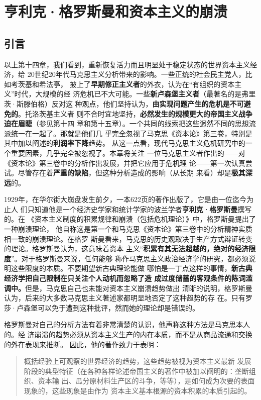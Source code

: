 \chapter{亨利克·格罗斯曼和资本主义的崩溃}

\section{引言}

以上第十四章，我们看到，重新恢复活力而且明显处于稳定状态的世界资本主义经济，给
20世纪20年代马克思主义分析带来的影响。一些正统的社会民主党人，比如考茨基和希法亭，
披上了\textbf{早期修正主义者}的外衣，认为在“有组织的资本主义”时代，大规模的经
济危机已不大可能。一些\textbf{新卢森堡主义者}（最著名的是弗里茨·斯滕伯格）反对这
种观点，他们坚持认为，\textbf{由实现问题产生的危机是不可避免的}。托洛茨基主义者
则不合时宜地坚持，\textbf{必然发生的规模更大的帝国主义战争迫在眉睫}（参见第十四
章和第十五章）。一个共同的线索把这些迥然不同的思想流派统一在一起了。那就是他们几
乎完全忽视了马克思《资本论》第三卷，特别是其中加以阐述的\textbf{利润率下降}趋势。
从这一点看，现代马克思主义危机研究中的一个重要因素，几乎完全被忽视了。本章将关注
一位马克思主义者作出的——对《资本论》第三卷中的分析作出发展，并把它应用于危机理
论——第一次认真尝试。尽管存在着\textbf{严重的缺陷}，但这种分析造成的影响（从长期
来看）却是\textbf{极其深远}的。

1929年，在华尔街大崩盘发生前夕，一本622页的著作出版了，它是由一位迄今为止人
们只知道他是一个经济史学家和统计学家的波兰学者\textbf{亨利克·格罗斯曼}撰写的。在
《资本主义制度的积累规律和崩溃（包括危机理论）》中，格罗斯曼提出了一种崩溃理论，
他自称这是第一个和马克思《资本论》第三卷中的分析精神实质相一致的崩溃理论。在格罗
斯曼看来，马克思的历史观取决于生产方式辩证转变的理论。格罗斯曼认为，这意味着资本
主义“\textbf{积累有其无法超越的，绝对的经济限度}”。对于格罗斯曼来说，任何能够
称作马克思主义政治经济学的研究，都必须说明这些限度的本质。不要期望新古典理论能做
哪怕是一丁点这样的事情，\textbf{新古典经济学把自己限制在只关注个人动机而忽略了造
成过度储蓄的客观条件的陈词滥调中。}但是，马克思自己也未能对资本主义崩溃趋势做出
清晰的说明，格罗斯曼认为，后来的大多数马克思主义著述家都明显地否定了这种趋势的存
在。只有罗莎·卢森堡可以免于遭到这种批评，然而她的理论却是错误的。

格罗斯曼对自己的分析方法有着非常清楚的认识，他声称这种方法是马克思本人的。经
济崩溃的趋势必须从资本主义生产的内在本质，而不是从商品流通和交换的外在表现来推断。
因此，他的著作致力于表明：
\begin{quotation}概括经验上可观察的世界经济的趋势，这些趋势被视为资本主义最新
发展阶段的典型特征（在各种各样论述帝国主义的著作中被加以阐明的：垄断组织、资本输
出、瓜分原材料生产区的斗争，等等），是如何成为次要的表面现象的，这些现象是由作为
资本主义基本根源的资本积累的本质引起的。
\end{quotation}

